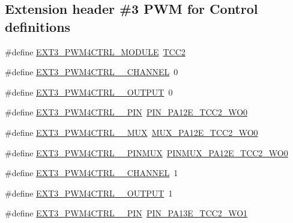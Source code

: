 \subsection*{Extension header \#3 P\+WM for Control definitions}
\begin{DoxyCompactItemize}
\item 
\#define \mbox{\hyperlink{group__samd21__xplained__pro__features__group_gab417c3517b117a905bbd28e331160b48}{E\+X\+T3\+\_\+\+P\+W\+M4\+C\+T\+R\+L\+\_\+\+M\+O\+D\+U\+LE}}~\mbox{\hyperlink{group___s_a_m_d21_j18_a__base_ga121a04059fe14ada844fa8b342359d6e}{T\+C\+C2}}
\item 
\#define \mbox{\hyperlink{group__samd21__xplained__pro__features__group_gafaaff56cae1e1b7aa0e5090516c77942}{E\+X\+T3\+\_\+\+P\+W\+M4\+C\+T\+R\+L\+\_\+\_\+\+C\+H\+A\+N\+N\+EL}}~0
\item 
\#define \mbox{\hyperlink{group__samd21__xplained__pro__features__group_ga7086d55de278d047187ffdf0cec93fa9}{E\+X\+T3\+\_\+\+P\+W\+M4\+C\+T\+R\+L\+\_\+\_\+\+O\+U\+T\+P\+UT}}~0
\item 
\#define \mbox{\hyperlink{group__samd21__xplained__pro__features__group_ga23c6f07973f026a49b9220ff594e33b9}{E\+X\+T3\+\_\+\+P\+W\+M4\+C\+T\+R\+L\+\_\+\_\+\+P\+IN}}~\mbox{\hyperlink{pio_2samd21j18a_8h_a1d916949e9d505da472007089e350ff8}{P\+I\+N\+\_\+\+P\+A12\+E\+\_\+\+T\+C\+C2\+\_\+\+W\+O0}}
\item 
\#define \mbox{\hyperlink{group__samd21__xplained__pro__features__group_ga26144ba68ff6978ca03eaad0939cbf31}{E\+X\+T3\+\_\+\+P\+W\+M4\+C\+T\+R\+L\+\_\+\_\+\+M\+UX}}~\mbox{\hyperlink{pio_2samd21j18a_8h_a64c2106fb38c282397958c89fbc25ebd}{M\+U\+X\+\_\+\+P\+A12\+E\+\_\+\+T\+C\+C2\+\_\+\+W\+O0}}
\item 
\#define \mbox{\hyperlink{group__samd21__xplained__pro__features__group_ga9c4ef156925c7ef38d85d34b4b7ecf2e}{E\+X\+T3\+\_\+\+P\+W\+M4\+C\+T\+R\+L\+\_\+\_\+\+P\+I\+N\+M\+UX}}~\mbox{\hyperlink{pio_2samd21j18a_8h_a035a1fcc417f3615276a933ae8cdb8c7}{P\+I\+N\+M\+U\+X\+\_\+\+P\+A12\+E\+\_\+\+T\+C\+C2\+\_\+\+W\+O0}}
\item 
\#define \mbox{\hyperlink{group__samd21__xplained__pro__features__group_ga967c7af5d92a1ba52ebaefa455835bc8}{E\+X\+T3\+\_\+\+P\+W\+M4\+C\+T\+R\+L\+\_\+\_\+\+C\+H\+A\+N\+N\+EL}}~1
\item 
\#define \mbox{\hyperlink{group__samd21__xplained__pro__features__group_ga449787266e17e0e2a0c8d4c466ed6a29}{E\+X\+T3\+\_\+\+P\+W\+M4\+C\+T\+R\+L\+\_\+\_\+\+O\+U\+T\+P\+UT}}~1
\item 
\#define \mbox{\hyperlink{group__samd21__xplained__pro__features__group_ga208afbd0b443467e32bbe296baa1523a}{E\+X\+T3\+\_\+\+P\+W\+M4\+C\+T\+R\+L\+\_\+\_\+\+P\+IN}}~\mbox{\hyperlink{pio_2samd21j18a_8h_a059ef09cbbf65788fb66a4c81ae8bf72}{P\+I\+N\+\_\+\+P\+A13\+E\+\_\+\+T\+C\+C2\+\_\+\+W\+O1}}

\end{DoxyCompactItemize}
